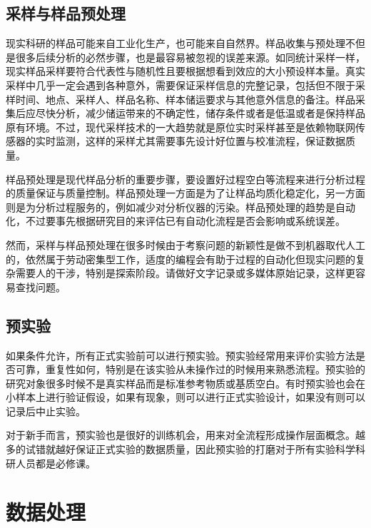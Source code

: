 \documentclass[]{tufte-book}
\begin{document}
\hypertarget{ux91c7ux6837ux4e0eux6837ux54c1ux9884ux5904ux7406}{%
\section{采样与样品预处理}\label{ux91c7ux6837ux4e0eux6837ux54c1ux9884ux5904ux7406}}

现实科研的样品可能来自工业化生产，也可能来自自然界。样品收集与预处理不但是很多后续分析的必然步骤，也是最容易被忽视的误差来源。如同统计采样一样，现实样品采样要符合代表性与随机性且要根据想看到效应的大小预设样本量。真实采样中几乎一定会遇到各种意外，需要保证采样信息的完整记录，包括但不限于采样时间、地点、采样人、样品名称、样本储运要求与其他意外信息的备注。样品采集后应尽快分析，减少储运带来的不确定性，储存条件或者是低温或者是保持样品原有环境。不过，现代采样技术的一大趋势就是原位实时采样甚至是依赖物联网传感器的实时监测，这样的采样尤其需要事先设计好位置与校准流程，保证数据质量。

样品预处理是现代样品分析的重要步骤，要设置好过程空白等流程来进行分析过程的质量保证与质量控制。样品预处理一方面是为了让样品均质化稳定化，另一方面则是为分析过程服务的，例如减少对分析仪器的污染。样品预处理的趋势是自动化，不过要事先根据研究目的来评估已有自动化流程是否会影响或系统误差。

然而，采样与样品预处理在很多时候由于考察问题的新颖性是做不到机器取代人工的，依然属于劳动密集型工作，适度的编程会有助于过程的自动化但现实问题的复杂需要人的干涉，特别是探索阶段。请做好文字记录或多媒体原始记录，这样更容易查找问题。

\hypertarget{ux9884ux5b9eux9a8c}{%
\section{预实验}\label{ux9884ux5b9eux9a8c}}

如果条件允许，所有正式实验前可以进行预实验。预实验经常用来评价实验方法是否可靠，重复性如何，特别是在该实验从未操作过的时候用来熟悉流程。预实验的研究对象很多时候不是真实样品而是标准参考物质或基质空白。有时预实验也会在小样本上进行验证假设，如果有现象，则可以进行正式实验设计，如果没有则可以记录后中止实验。

对于新手而言，预实验也是很好的训练机会，用来对全流程形成操作层面概念。越多的试错就越好保证正式实验的数据质量，因此预实验的打磨对于所有实验科学科研人员都是必修课。

\hypertarget{data}{%
\chapter{数据处理}\label{data}}
\end{document}
